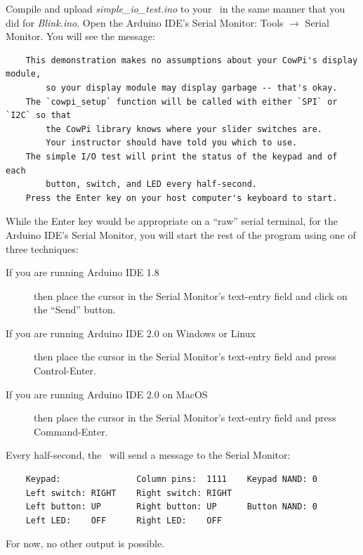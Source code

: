 
Compile and upload \textit{simple\_io\_test.ino} to your \developmentboard\ in the same manner that you did for \textit{Blink.ino}.
Open the Arduino IDE's Serial Monitor: Tools $\rightarrow$ Serial Monitor.
You will see the message:

\begin{verbatim}
    This demonstration makes no assumptions about your CowPi's display module,
        so your display module may display garbage -- that's okay.
    The `cowpi_setup` function will be called with either `SPI` or `I2C` so that
        the CowPi library knows where your slider switches are.
        Your instructor should have told you which to use.
    The simple I/O test will print the status of the keypad and of each
        button, switch, and LED every half-second.
    Press the Enter key on your host computer's keyboard to start.
\end{verbatim}

While the Enter key would be appropriate on a ``raw'' serial terminal, for the Arduino IDE's Serial Monitor, you will start the rest of the program using one of three techniques:
\begin{description}
    \item[If you are running Arduino IDE 1.8] then place the cursor in the Serial Monitor's text-entry field and click on the ``Send'' button.
    \item[If you are running Arduino IDE 2.0 on Windows or Linux] then place the cursor in the Serial Monitor's text-entry field and press Control-Enter.
    \item[If you are running Arduino IDE 2.0 on MacOS] then place the cursor in the Serial Monitor's text-entry field and press Command-Enter.
\end{description}

Every half-second, the \developmentboard\ will send a message to the Serial Monitor:

\begin{verbatim}
    Keypad:               Column pins:  1111    Keypad NAND: 0
    Left switch: RIGHT    Right switch: RIGHT
    Left button: UP       Right button: UP      Button NAND: 0
    Left LED:    OFF      Right LED:    OFF
\end{verbatim}

For now, no other output is possible.
